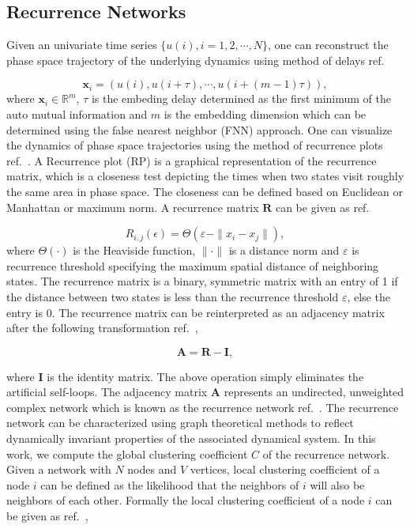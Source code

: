 \documentclass[a4paper]{jpconf}
\begin{document}
\subsection{Recurrence Networks}
Given an univariate time series $\{u(i) , i = 1,2, \cdots ,N \}$, one can reconstruct the phase space trajectory of the underlying dynamics using method of delays ref.~\cite{takens1981detecting}

\begin{equation}
\mathbf{x}_{i} = (u(i),u(i+\tau),\cdots,u(i+(m-1)\tau)),
\end{equation}
where $\mathbf{x}_{i} \in \mathbb{R}^m$, $\tau$ is the embeding delay determined as the first minimum of the auto mutual information and $m$ is the embedding dimension which can be determined using the false nearest neighbor (FNN) approach. One can visualize the dynamics of phase space trajectories using the method of recurrence plots ref.~\cite{eckmann1987recurrence}. A Recurrence plot (RP) is a graphical representation of the recurrence matrix, which is a closeness test depicting the times when two states visit roughly the same area in phase space. The closeness can be defined based on Euclidean or Manhattan or maximum norm. A recurrence matrix $\mathbf{R}$ can be given as ref.~\cite{marwan2009complex,donner2010recurrence}

\begin{equation}
R_{i,j}(\epsilon)=\Theta(\varepsilon - \| x_{i}-x_{j}\|),
\end{equation}
where $\Theta(\cdot)$ is the Heaviside function, $\|\cdot\|$ is a distance norm and $\varepsilon $ is recurrence threshold specifying the maximum spatial distance of neighboring states. The recurrence matrix is a binary, symmetric matrix with an entry of 1 if the distance between two states is less than the recurrence threshold $\varepsilon$, else the entry is 0. The recurrence matrix can be reinterpreted as an adjacency matrix after the following transformation ref.~\cite{marwan2009complex,donner2010recurrence},

\begin{equation}
\mathbf{A} = \mathbf{R}-\mathbf{I},
\end{equation}

where $\mathbf{I}$ is the identity matrix. The above operation simply eliminates the artificial self-loops. The adjacency matrix $\mathbf{A}$ represents an undirected, unweighted complex network which is known as the recurrence network ref.~\cite{donner2010recurrence}. 
The recurrence network can be characterized using graph theoretical methods to reflect dynamically invariant properties of the associated dynamical system. In this work, we compute the global clustering coefficient $C$ of the recurrence network. Given a network with $N$ nodes and $V$ vertices, local clustering coefficient of a node $i$ can be defined as the likelihood that the neighbors of $i$ will also be neighbors of each other. Formally the local clustering coefficient of a node $i$ can be given as ref.~\cite{watts1998collective},
\end{document}
